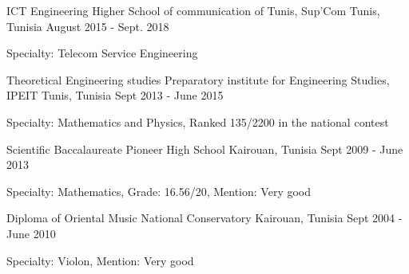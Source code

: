 

\begin{cventries}

  \cventry
    {ICT Engineering} %
    {Higher School of communication of Tunis, Sup'Com} %
    {Tunis, Tunisia} %
    {August 2015 - Sept. 2018} %
    {
      \begin{cvitems} %
        \item { Specialty: Telecom Service Engineering}
      \end{cvitems}
    }
    
    \cventry
    {Theoretical Engineering studies } %
    {Preparatory institute for Engineering Studies, IPEIT} %
    {Tunis, Tunisia} %
    {Sept 2013 - June 2015} %
    {
      \begin{cvitems} %
        \item { Specialty: Mathematics and Physics, Ranked 135/2200 in the national contest}
      \end{cvitems}
    }
    
     \cventry
    {Scientific Baccalaureate} %
    {Pioneer High School} %
    {Kairouan, Tunisia} %
    {Sept 2009 - June 2013} %
    {
      \begin{cvitems} %
        \item { Specialty: Mathematics, Grade: 16.56/20, Mention: Very good }
      \end{cvitems}
    }
    
    \cventry
    {Diploma of Oriental Music} %
    {National Conservatory} %
    {Kairouan, Tunisia} %
    {Sept 2004 - June 2010} %
    {
      \begin{cvitems} %
        \item { Specialty: Violon, Mention: Very good }
      \end{cvitems}
    }
    
\end{cventries}
